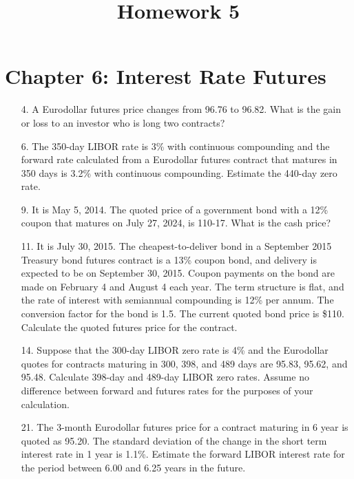 \documentclass{article}
\begin{document}
\title{Homework 5}
\maketitle
\thispagestyle{fancy}

\section*{Chapter 6: Interest Rate Futures}

\begin{itemize}
	\item[4.] A Eurodollar futures price changes from 96.76 to 96.82. What is the gain or loss to an investor who is long two contracts?

	\item[6.] The 350-day LIBOR rate is 3\% with continuous compounding and the forward rate calculated from a Eurodollar futures contract that matures in 350 days is 3.2\% with continuous compounding. Estimate the 440-day zero rate.

	\item[9.] It is May 5, 2014. The quoted price of a government bond with a 12\% coupon that matures on July 27, 2024, is 110-17. What is the cash price?

	\item[11.] It is July 30, 2015. The cheapest-to-deliver bond in a September 2015 Treasury bond futures contract is a 13\% coupon bond, and delivery is expected to be on September 30, 2015. Coupon payments on the bond are made on February 4 and August 4 each year. The term structure is flat, and the rate of interest with semiannual compounding is 12\% per annum. The conversion factor for the bond is 1.5. The current quoted bond price is \$110. Calculate the quoted futures price for the contract.

	\item[14.] Suppose that the 300-day LIBOR zero rate is 4\% and the Eurodollar quotes for contracts maturing in 300, 398, and 489 days are 95.83, 95.62, and 95.48. Calculate 398-day and 489-day LIBOR zero rates. Assume no difference between forward and futures rates for the purposes of your calculation.

	\item[21.] The 3-month Eurodollar futures price for a contract maturing in 6 year is quoted as 95.20. The standard deviation of the change in the short term interest rate in 1 year is 1.1\%. Estimate the forward LIBOR interest rate for the period between 6.00 and 6.25 years in the future.


\end{itemize}
\end{document}
